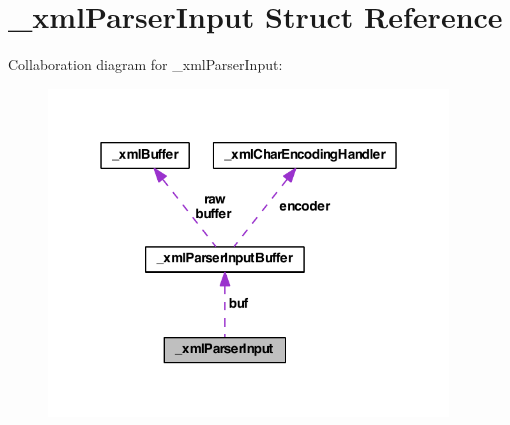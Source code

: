 \hypertarget{struct__xml_parser_input}{\section{\-\_\-xml\-Parser\-Input Struct Reference}
\label{struct__xml_parser_input}
}


Collaboration diagram for \-\_\-xml\-Parser\-Input\-:
\nopagebreak
\begin{figure}[H]
\begin{center}
\leavevmode
\includegraphics[width=301pt]{struct__xml_parser_input__coll__graph}
\end{center}
\end{figure}
